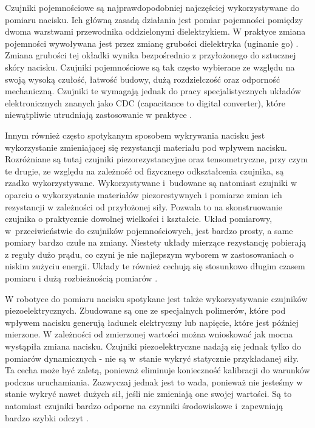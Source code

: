 Czujniki pojemnościowe są najprawdopodobniej najczęściej wykorzystywane do pomiaru nacisku. Ich główną zasadą działania jest pomiar pojemności pomiędzy dwoma warstwami przewodnika oddzielonymi dielektrykiem. W praktyce zmiana pojemności wywoływana jest przez zmianę grubości dielektryka (uginanie go) \cite{b_konf_kaczka_przekroj}. Zmiana grubości tej okładki wynika bezpośrednio z przyłożonego do sztucznej skóry nacisku. Czujniki pojemnościowe są tak często wybierane ze względu na swoją wysoką czułość, łatwość budowy, dużą rozdzielczość oraz odporność mechaniczną. Czujniki te wymagają jednak do pracy specjalistycznych układów elektronicznych znanych jako CDC (capacitance to digital converter), które niewątpliwie utrudniają zastosowanie w praktyce \cite{b_article_reviev_2_tactile_skin, b_konf_wloch_1_opis_budowy}.

Innym również często spotykanym sposobem wykrywania nacisku jest wykorzystanie zmieniającej się rezystancji materiału pod wpływem nacisku. Rozróżniane są tutaj czujniki piezorezystancyjne oraz tensometryczne, przy czym te drugie, ze względu na zależność od fizycznego odkształcenia czujnika, są rzadko wykorzystywane. Wykorzystywane i~budowane są natomiast czujniki w oparciu o wykorzystanie materiałów piezorestywnych i pomiarze zmian ich rezystancji w zależności od przyłożonej siły. Pozwala to na skonstruowanie czujnika o praktycznie dowolnej wielkości i kształcie. Układ pomiarowy, w~przeciwieństwie do czujników pojemnościowych, jest bardzo prosty, a same pomiary bardzo czułe na zmiany. Niestety układy mierzące rezystancję pobierają z reguły dużo prądu, co czyni je nie najlepszym wyborem w zastosowaniach o niskim zużyciu energii. Układy te również cechują się stosunkowo długim czasem pomiaru i dużą rozbieżnością pomiarów \cite{b_article_reviev_tactile_skin, b_article_reviev_2_tactile_skin, b_konf_tactile_resist_review}.

W robotyce do pomiaru nacisku spotykane jest także wykorzystywanie czujników piezoelektrycznych. Zbudowane są one ze specjalnych polimerów, które pod wpływem nacisku generują ładunek elektryczny lub napięcie, które jest później mierzone. W zależności od zmierzonej wartości można wnioskować jak mocna wystąpiła zmiana nacisku. Czujniki piezoelektryczne nadają się jednak tylko do pomiarów dynamicznych - nie są w~stanie wykryć statycznie przykładanej siły. Ta cecha może być zaletą, ponieważ eliminuje konieczność kalibracji do warunków podczas uruchamiania. Zazwyczaj jednak jest to wada, ponieważ nie jesteśmy w stanie wykryć nawet dużych sił, jeśli nie zmieniają one swojej wartości. Są to natomiast czujniki bardzo odporne na czynniki środowiskowe i~zapewniają bardzo szybki odczyt \cite{b_article_tactile_piezo, b_article_reviev_tactile_skin, b_article_reviev_2_tactile_skin}.

